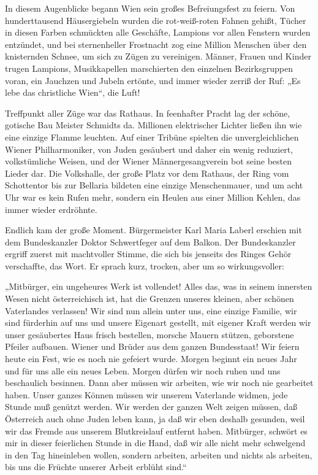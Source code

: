 In diesem Augenblicke begann Wien sein großes Befreiungsfest zu
feiern. Von hunderttausend Häusergiebeln wurden die rot-weiß-roten
Fahnen gehißt, Tücher in diesen  Farben schmückten
alle Geschäfte, Lampions vor allen Fenstern wurden entzündet, und
bei sternenheller Frostnacht zog eine Million Menschen über den
knisternden Schnee, um sich zu Zügen zu vereinigen. Männer, Frauen
und Kinder trugen Lampions, Musikkapellen marschierten den
einzelnen Bezirksgruppen voran, ein Jauchzen und Jubeln ertönte,
und immer wieder zerriß der Ruf: „Es lebe das christliche Wien“,
die Luft!

Treffpunkt aller Züge war das Rathaus. In feenhafter Pracht lag der
schöne, gotische Bau Meister Schmidts da. Millionen elektrischer
Lichter ließen ihn wie eine einzige Flamme leuchten. Auf einer
Tribüne spielten die unvergleichlichen Wiener Philharmoniker, von
Juden gesäubert und daher ein wenig reduziert, volkstümliche
Weisen, und der Wiener Männergesangverein bot seine besten Lieder
dar. Die Volkshalle, der große Platz vor dem Rathaus, der Ring vom
Schottentor bis zur Bellaria bildeten eine einzige Menschenmauer,
und um acht Uhr war es kein Rufen mehr, sondern ein Heulen aus
einer Million Kehlen, das immer wieder erdröhnte.

Endlich kam der große Moment. Bürgermeister Karl Maria Laberl
erschien mit dem Bundeskanzler Doktor Schwertfeger auf dem Balkon.
Der Bundeskanzler ergriff zuerst mit machtvoller Stimme, die sich
bis jenseits des Ringes Gehör verschaffte, das Wort. Er sprach
kurz, trocken, aber um so wirkungsvoller:

„Mitbürger, ein ungeheures Werk ist vollendet! Alles das, was in
seinem innersten Wesen nicht österreichisch ist, 
hat die Grenzen unseres kleinen, aber schönen Vaterlandes
verlassen! Wir sind nun allein unter uns, eine einzige Familie, wir
sind fürderhin auf uns und unsere Eigenart gestellt, mit eigener
Kraft werden wir unser gesäubertes Haus frisch bestellen, morsche
Mauern stützen, geborstene Pfeiler aufbauen. Wiener und Brüder aus
dem ganzen Bundesstaat! Wir feiern heute ein Fest, wie es noch nie
gefeiert wurde. Morgen beginnt ein neues Jahr und für uns alle ein
neues Leben. Morgen dürfen wir noch ruhen und uns beschaulich
besinnen. Dann aber müssen wir arbeiten, wie wir noch nie
gearbeitet haben. Unser ganzes Können müssen wir unserem Vaterlande
widmen, jede Stunde muß genützt werden. Wir werden der ganzen Welt
zeigen müssen, daß Österreich auch ohne Juden leben kann, ja daß
wir eben deshalb gesunden, weil wir das Fremde aus unserem
Blutkreislauf entfernt haben. Mitbürger, schwört es mir in dieser
feierlichen Stunde in die Hand, daß wir alle nicht mehr schwelgend
in den Tag hineinleben wollen, sondern arbeiten, arbeiten und
nichts als arbeiten, bis uns die Früchte unserer Arbeit erblüht
sind.“

